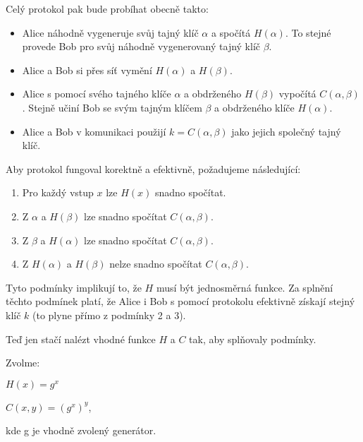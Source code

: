\documentclass[12pt]{article}
\begin{document}
    \medskip

    Celý protokol pak bude probíhat obecně takto:
    
    \begin{itemize}
        \item
            Alice náhodně vygeneruje svůj tajný klíč $\alpha$ a spočítá $H(\alpha)$.
            To stejné provede Bob pro svůj náhodně vygenerovaný tajný klíč $\beta$.
        \item
            Alice a Bob si přes síť vymění $H(\alpha)$ a $H(\beta)$.
        \item
            Alice s pomocí svého tajného klíče $\alpha$ a obdrženého $H(\beta)$ vypočítá $C(\alpha,\beta)$.
            Stejně učiní Bob se svým tajným klíčem $\beta$ a obdrženého klíče $H(\alpha)$.
        \item
            Alice a Bob v komunikaci použijí $k = C(\alpha,\beta)$ jako jejich společný tajný klíč.
    \end{itemize}

    Aby protokol fungoval korektně a efektivně, požadujeme následující:

    \begin{enumerate}
        \item
            Pro každý vstup $x$ lze $H(x)$ snadno spočítat.
        \item
            Z $\alpha$ a $H(\beta)$ lze snadno spočítat $C(\alpha,\beta)$.
        \item
            Z $\beta$ a $H(\alpha)$ lze snadno spočítat $C(\alpha,\beta)$.
        \item
            Z $H(\alpha)$ a $H(\beta)$ nelze snadno spočítat $C(\alpha,\beta)$.
    \end{enumerate}

    Tyto podmínky implikují to, že $H$ musí být jednosměrná funkce.
    Za splnění těchto podmínek platí, že Alice i Bob s pomocí protokolu efektivně získají
    stejný klíč $k$ (to plyne přímo z podmínky 2 a 3).

    \medskip

    Teď jen stačí nalézt vhodné funkce $H$ a $C$ tak, aby splňovaly podmínky.

    \medskip

    Zvolme:

    \begin{center}
        $H(x) = g^x$

        $C(x, y) = (g^x)^y$,

        \medskip
        kde g je vhodně zvolený generátor.
    \end{center}
\end{document}
